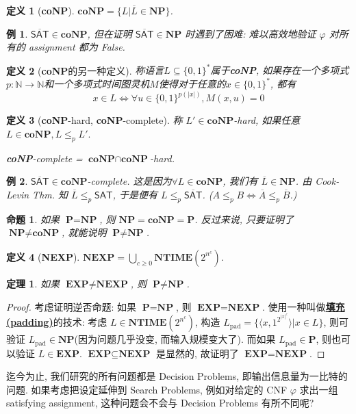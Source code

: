 \documentclass[8pt]{article}
\theoremstyle{compact}
\newtheorem{theorem}{定理}[section]
\newtheorem{definition}{定义}[section]
\newtheorem{proposition}{命题}[section]
\newtheorem{example}{例}[section]
\def\obj#1{\textbf{\uline{#1}}}
\def\le{\leqslant}
\def\ge{\geqslant}
\def\NTIME{\textbf{NTIME}}
\def\P{\textbf{P}}
\def\NP{\textbf{NP}}
\def\coNP{\textbf{coNP}}
\def\EXP{\textbf{EXP}}
\def\NEXP{\textbf{NEXP}}
\begin{document}
\begin{definition}[\coNP]
	$\coNP = \{L | \overline{L} \in \NP\}$.
\end{definition}
\begin{example}
	$\overline{\textsf{SAT}} \in \coNP$, 但在证明 $\overline{\textsf{SAT}} \in \NP$ 时遇到了困难: 难以高效地验证 $\varphi$ 对所有的 assignment 都为 False.
\end{example}
\begin{definition}[\coNP 的另一种定义]
	称语言$L \subseteq \{0, 1\}^*$属于\coNP, 如果存在一个多项式$p: \mathbb N \to \mathbb N$和一个多项式时间图灵机$M$使得对于任意的$x \in \{0, 1\}^*$, 都有
	$$x \in L \Leftrightarrow \forall u \in \{0, 1\}^{p(|x|)}, M(x, u) = 0$$
\end{definition}
\begin{definition}[\coNP-hard, \coNP-complete]
	称 $L' \in \coNP$-hard, 如果任意 $L \in \coNP, L \le_p L'.$
	
	\coNP-complete = $\coNP \cap \coNP$-hard.
\end{definition}
\begin{example}
	$\overline{\textsf{SAT}} \in \coNP$-complete. 这是因为$\forall L \in \coNP$, 我们有 $\overline L \in \NP$. 由 Cook-Levin Thm. 知 $\overline L \le_p \textsf{SAT}$, 于是便有 $L \le_p \overline{\textsf{SAT}}$. ($A \le_p B \Leftrightarrow \overline A \le_p \overline B$.)
\end{example}
\begin{proposition}
	如果 $\P = \NP$, 则 $\NP = \coNP = \P$. 反过来说, 只要证明了 $\NP \neq \coNP$, 就能说明 $\P \neq \NP$.
\end{proposition}
\begin{definition}[\NEXP]
	$\NEXP = \bigcup_{c \ge 0}\NTIME(2^{n^c})$.
\end{definition}
\begin{theorem}
	如果 $\EXP \neq \NEXP$, 则 $\P \neq \NP$.
\end{theorem}
\begin{proof}
	考虑证明逆否命题: 如果 $\P = \NP$, 则 $\EXP = \NEXP$. 使用一种叫做\obj{填充(padding)}的技术: 考虑 $L \in \NTIME(2^{n^c})$, 构造 $L_{\text{pad}} = \{\langle x, 1^{2^{|x|^c}}\rangle | x \in L\}$, 则可验证 $L_{\text{pad}} \in \NP$(因为问题几乎没变, 而输入规模变大了). 而如果 $L_{\text{pad}} \in \P$, 则也可以验证 $L \in \EXP$. $\EXP \subseteq \NEXP$ 是显然的, 故证明了 $\EXP = \NEXP$.
\end{proof}

迄今为止, 我们研究的所有问题都是 Decision Problems, 即输出信息量为一比特的问题. 如果考虑把设定延伸到 Search Problems, 例如对给定的 CNF $\varphi$ 求出一组 satisfying assignment, 这种问题会不会与 Decision Problems 有所不同呢?
\end{document}
